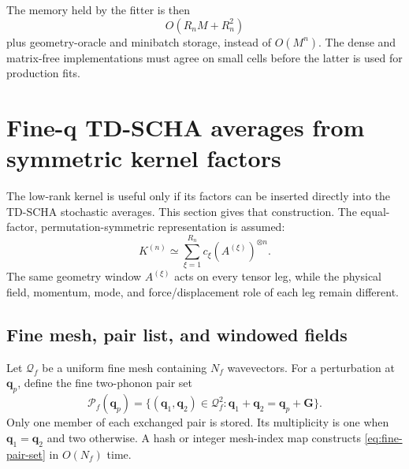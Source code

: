 \documentclass{article}
\newcommand{\Nf}{N_f}
\begin{document}
The memory held by the fitter is then
\begin{equation}
    O(R_nM+R_n^2)
    \label{eq:matrixfree-fit-memory}
\end{equation}
plus geometry-oracle and minibatch storage, instead of $O(M^n)$. The dense
and matrix-free implementations must agree on small cells before the latter
is used for production fits.

\section{Fine-q TD-SCHA averages from symmetric kernel factors}
\label{sec:fine-averages}

The low-rank kernel is useful only if its factors can be inserted directly
into the TD-SCHA stochastic averages. This section gives that construction.
The equal-factor, permutation-symmetric representation is assumed:
\begin{equation}
    K^{(n)}
    \simeq
    \sum_{\xi=1}^{R_n}c_\xi
    (A^{(\xi)})^{\otimes n}.
    \label{eq:fine-kernel-symmetric}
\end{equation}
The same geometry window $A^{(\xi)}$ acts on every tensor leg, while the
physical field, momentum, mode, and force/displacement role of each leg
remain different.

\subsection{Fine mesh, pair list, and windowed fields}
\label{sec:fine-fields}

Let $\mathcal Q_f$ be a uniform fine mesh containing $\Nf$ wavevectors.
For a perturbation at $\bm q_p$, define the fine two-phonon pair set
\begin{equation}
    \mathcal P_f(\bm q_p)
    =
    \{(\bm q_1,\bm q_2)\in\mathcal Q_f^2:
    \bm q_1+\bm q_2=\bm q_p+\bm G\}.
    \label{eq:fine-pair-set}
\end{equation}
Only one member of each exchanged pair is stored. Its multiplicity is one
when $\bm q_1=\bm q_2$ and two otherwise. A hash or integer mesh-index map
constructs \autoref{eq:fine-pair-set} in $O(\Nf)$ time.
\end{document}
